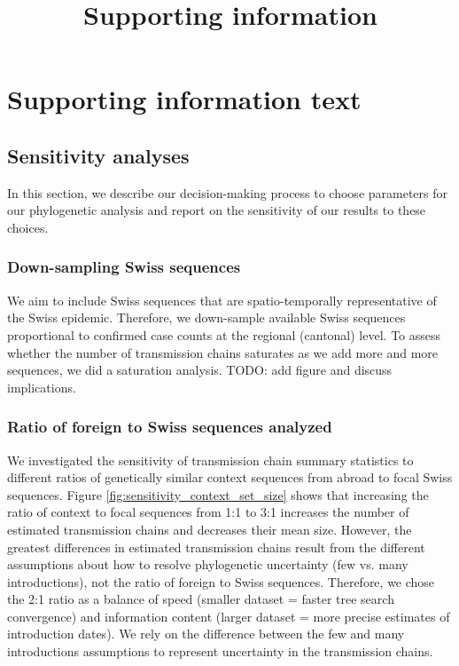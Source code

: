 \documentclass[9pt,twoside,lineno]{pnas-new}
\title{Supporting information}
\begin{document}
\maketitle 

\section{Supporting information text}

\subsection{Sensitivity analyses}

In this section, we describe our decision-making process to choose parameters for our phylogenetic analysis and report on the sensitivity of our results to these choices. 

\subsubsection{Down-sampling Swiss sequences}
We aim to include Swiss sequences that are spatio-temporally representative of the Swiss epidemic. Therefore, we down-sample available Swiss sequences proportional to confirmed case counts at the regional (cantonal) level. To assess whether the number of transmission chains saturates as we add more and more sequences, we did a saturation analysis. TODO: add figure and discuss implications.

\subsubsection{Ratio of foreign to Swiss sequences analyzed}
We investigated the sensitivity of transmission chain summary statistics to different ratios of genetically similar context sequences from abroad to focal Swiss sequences. Figure \ref{fig:sensitivity_context_set_size} shows that increasing the ratio of context to focal sequences from 1:1 to 3:1 increases the number of estimated transmission chains and decreases their mean size. However, the greatest differences in estimated transmission chains result from the different assumptions about how to resolve phylogenetic uncertainty (few vs. many introductions), not the ratio of foreign to Swiss sequences. Therefore, we chose the 2:1 ratio as a balance of speed (smaller dataset = faster tree search convergence) and information content (larger dataset = more precise estimates of introduction dates). We rely on the difference between the few and many introductions assumptions to represent uncertainty in the transmission chains.
\end{document}
